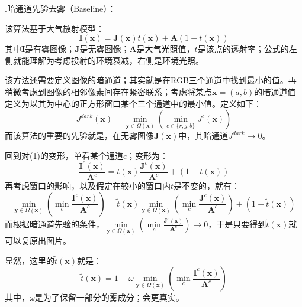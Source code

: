 \documentclass[12pt]{article}
\begin{document}
\begin{large}
    .暗通道先验去雾（Baseline）：\par
\end{large}
该算法基于大气散射模型：\begin{equation}\label{eqn-1} 
  \bm{I}(\bm{x}) = \bm{J}(\bm{x})t(\bm{x})+\bm{A}(1-t(\bm{x}))
\end{equation}
其中$\bm{I}$是有雾图像；$\bm{J}$是无雾图像；$\bm{A}$是大气光照值，$t$是该点的透射率；公式的左侧就能理解为考虑投射的环境衰减，右侧是环境光照。\par
该方法还需要定义图像的暗通道；其实就是在RGB三个通道中找到最小的值。再稍微考虑到图像的相邻像素间存在紧密联系；考虑将某点$\bm{x}=(a,b)$的暗通道值定义为以其为中心的正方形窗口某个三个通道中的最小值。定义如下：\begin{equation}\label{eqn-1} 
    J^{dark}(\bm{x}) = \mathop{\mathrm{min}}\limits_{\bm{y}\in \Omega({\bm{x}})}(\mathop{\mathrm{min}}\limits_{c\in\{r,g,b\}}J^{c}(\bm{x}))
\end{equation}
而该算法的重要的先验就是，在无雾图像$\bm{J}(\bm{x})$中，其暗通道$J^{dark}\rightarrow 0$。\par
回到对(1)的变形，单看某个通道$c$；变形为：\begin{equation}\label{eqn-1} 
  \frac{\bm{I}^c(\bm{x})}{\bm{A}^c} = t(\bm{x})\frac{\bm{J}^c(\bm{x})}{\bm{A}^c}+(1-t(\bm{x}))
\end{equation}再考虑窗口的影响，以及假定在较小的窗口内$t$是不变的，就有：
\begin{equation}\label{eqn-1} 
  \mathop{\mathrm{min}}\limits_{\bm{y}\in \Omega({\bm{x}})}(\mathop{\mathrm{min}}\limits_{c}\frac{\bm{I}^c(\bm{x})}{\bm{A}^c}) = \widetilde{t}(\bm{x}) \mathop{\mathrm{min}}\limits_{\bm{y}\in \Omega({\bm{x}})}(\mathop{\mathrm{min}}\limits_{c}\frac{\bm{J}^c(\bm{x})}{\bm{A}^c})+(1-\widetilde{t}(\bm{x}))
\end{equation}
而根据暗通道先验的条件，$\displaystyle\mathop{\mathrm{min}}\limits_{\bm{y}\in \Omega({\bm{x}})}(\mathop{\mathrm{min}}\limits_{c}\frac{\bm{J}^c(\bm{x})}{\bm{A}^c})\rightarrow 0$，于是只要得到$\widetilde{t}(\bm{x})$就可以复原出图片。\par
显然，这里的$\widetilde{t}(\bm{x})$就是：\begin{equation}\label{eqn-1} 
  \widetilde{t}(\bm{x}) = 1-\omega  \mathop{\mathrm{min}}\limits_{\bm{y}\in \Omega({\bm{x}})}(\mathop{\mathrm{min}}\limits_{c}\frac{\bm{I}^c(\bm{x})}{\bm{A}^c}) 
\end{equation}
其中，$\omega$是为了保留一部分的雾成分；会更真实。\par
\end{document}
